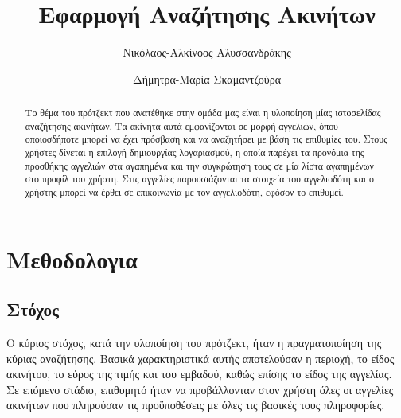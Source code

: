 \documentclass[manuscript,screen,review, language=greek, language=english]{acmart}
\begin{document}
\title{Εφαρμογή Αναζήτησης Ακινήτων}

\author{Νικόλαος-Αλκίνοος Αλυσσανδράκης}

\author{Δήμητρα-Μαρία Σκαμαντζούρα}

\begin{abstract}
	Το θέμα του πρότζεκτ που ανατέθηκε στην ομάδα μας είναι η υλοποίηση μίας ιστοσελίδας
	αναζήτησης ακινήτων. Τα ακίνητα αυτά εμφανίζονται σε μορφή αγγελιών, όπου
	οποιοσδήποτε μπορεί να έχει πρόσβαση και να αναζητήσει με βάση τις επιθυμίες του.
	Στους χρήστες δίνεται η επιλογή δημιουργίας λογαριασμού, η οποία παρέχει τα προνόμια
	της προσθήκης αγγελιών στα αγαπημένα και την συγκρώτηση τους σε μία λίστα αγαπημένων
	στο προφίλ του χρήστη. Στις αγγελίες παρουσιάζονται τα στοιχεία του αγγελιοδότη και
	ο χρήστης μπορεί να έρθει σε επικοινωνία με τον αγγελιοδότη, εφόσον το επιθυμεί.
\end{abstract}


\maketitle

\section{Μεθοδολογια}

\subsection{Στόχος}
	Ο κύριος στόχος, κατά την υλοποίηση του πρότζεκτ, ήταν η πραγματοποίηση της κύριας
	αναζήτησης. Βασικά χαρακτηριστικά αυτής αποτελούσαν η περιοχή, το είδος ακινήτου, το
	εύρος της τιμής και του εμβαδού, καθώς επίσης το είδος της αγγελίας. Σε επόμενο
	στάδιο, επιθυμητό ήταν να προβάλλονταν στον χρήστη όλες οι αγγελίες ακινήτων που
	πληρούσαν τις προϋποθέσεις με όλες τις βασικές τους πληροφορίες.
\end{document}
